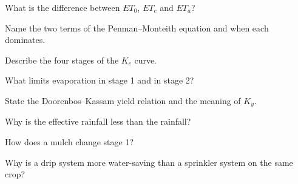\begin{exlist}
\item What is the difference between $ET_0$, $ET_c$ and $ET_a$?
\item Name the two terms of the Penman--Monteith equation and when each dominates.
\item Describe the four stages of the $K_c$ curve.
\item What limits evaporation in stage 1 and in stage 2?
\item State the Doorenbos--Kassam yield relation and the meaning of $K_y$.
\item Why is the effective rainfall less than the rainfall?
\item How does a mulch change stage 1?
\item Why is a drip system more water-saving than a sprinkler system on the same crop?
\end{exlist}

